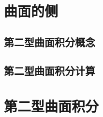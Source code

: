 \section{曲面的侧}
\subsection{第二型曲面积分概念}
\subsection{第二型曲面积分计算}
\section{第二型曲面积分}
\begin{exercise}
\item
\end{exercise}
\begin{exercise*}
\item
\end{exercise*}




\endinput
